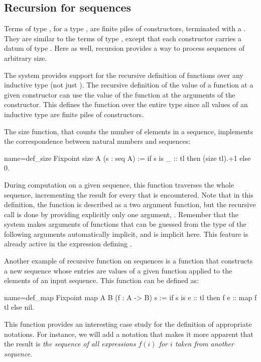\subsection{Recursion for sequences}

Terms of type , for a type , are finite piles of
 constructors, terminated with a . They are similar to
the terms of type , except that each  constructor
carries a datum of type . Here as well, recursion provides a way
to process sequences of arbitrary size.


The \Coq{} system provides support for the recursive definition of
functions over any inductive type (not just ). The recursive
definition of the value of a
function at a given constructor can use the value of the function at
the arguments of the constructor. This defines the function over the
entire type since all values of an inductive type are finite piles of
constructors.

The size function, that counts the number of elements in a sequence,
implements the correspondence between natural numbers and sequences:

\begin{coq}{name=def_size}{}
Fixpoint size A (s : seq A) :=
  if s is _ :: tl then (size tl).+1 else 0.
\end{coq}
During computation on a given sequence, this function traverses
the whole sequence, incrementing the result for every
 that is encountered.  Note that in this
definition, the function  is described as a two argument
function, but the recursive call  is done by providing
explicitly only one argument, . Remember that
the \Coq{} system makes
arguments of functions that can be guessed from the type of the following
arguments automatically implicit, and  is implicit here. This
feature is already active in the expression defining .

Another example of recursive function on sequences is a function that constructs
a new sequence whose entries are values of a given function applied to
the elements of an input sequence.  This function can be defined as:

\begin{coq}{name=def_map}{}
Fixpoint map A B (f : A -> B) s :=
  if s is e :: tl then f e :: map f tl else nil.
\end{coq}
This function provides an interesting case study for the definition of
appropriate notations. For instance, we will add a notation that
makes it more apparent that the result is {\em the sequence of all
expressions \(f(i)\) for \(i\) taken from another sequence}.

